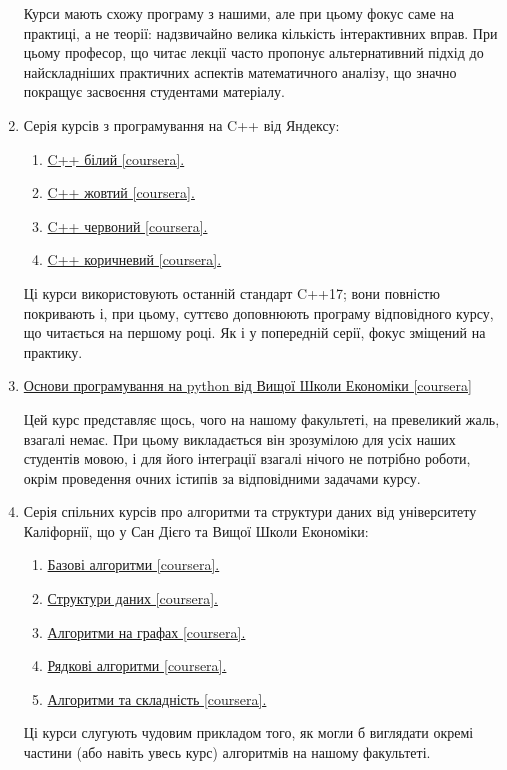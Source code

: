 \documentclass[14pt, a4paper]{extarticle}  %
\begin{document}
\begin{enumerate}
    Курси мають схожу програму з нашими, але при цьому фокус саме на практиці, а не теорії: надзвичайно велика кількість інтерактивних вправ. При цьому професор, що читає лекції часто пропонує альтернативний підхід до найскладніших практичних аспектів математичного аналізу, що значно покращує засвоєння студентами матеріалу.

    \item Серія курсів з програмування на C++ від Яндексу:
    \begin{enumerate}
    	\item \href{https://www.coursera.org/learn/c-plus-plus-white/home/welcome}{C++ білий [coursera].}
    	\item \href{https://www.coursera.org/learn/c-plus-plus-yellow/home/welcome}{C++ жовтий [coursera].}
    	\item \href{https://www.coursera.org/learn/c-plus-plus-red/home/welcome}{C++ червоний [coursera].}
    	\item \href{https://www.coursera.org/learn/c-plus-plus-brown/home/welcome}{C++ коричневий [coursera].}
    \end{enumerate}
    Ці курси використовують останній стандарт C++17; вони повністю покривають і, при цьому, суттєво доповнюють програму відповідного курсу, що читається на першому році. Як і у попередній серії, фокус зміщений на практику.

    \item \href{https://www.coursera.org/learn/python-osnovy-programmirovaniya/home/welcome}{Основи програмування на python від Вищої Школи Економіки [coursera]} 
    
    Цей курс представляє щось, чого на нашому факультеті, на превеликий жаль, взагалі немає. При цьому викладається він зрозумілою для усіх наших студентів мовою, і для його інтеграції взагалі нічого не потрібно роботи, окрім проведення очних істипів за відповідними задачами курсу.

    \item Серія спільних курсів про алгоритми та структури даних від університету Каліфорнії, що у Сан Дієго та Вищої Школи Економіки:
    \begin{enumerate}
    	\item \href{https://www.coursera.org/learn/algorithmic-toolbox}{Базові алгоритми [coursera].}
    	\item \href{https://www.coursera.org/learn/data-structures}{Структури даних [coursera].}
    	\item \href{https://www.coursera.org/learn/algorithms-on-graphs}{Алгоритми на графах [coursera].}
    	\item \href{https://www.coursera.org/learn/algorithms-on-strings}{Рядкові алгоритми [coursera].}
    	\item \href{https://www.coursera.org/learn/advanced-algorithms-and-complexity}{Алгоритми та складність [coursera].}
    \end{enumerate}
    Ці курси слугують чудовим прикладом того, як могли б виглядати окремі частини (або навіть увесь курс) алгоритмів на нашому факультеті. 
  

\end{enumerate}
\end{document}
